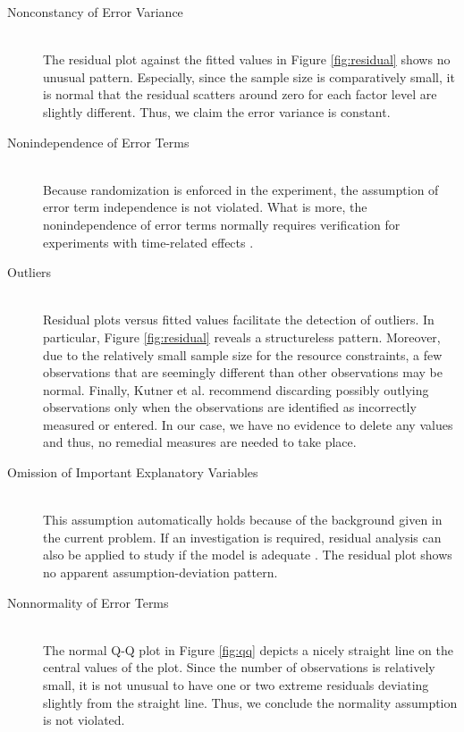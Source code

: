 \documentclass[11pt]{article}
\begin{document}
\begin{description}
\item [Nonconstancy of Error Variance] \hfill \\ The residual plot against the fitted values in Figure \ref{fig:residual} shows no unusual pattern. Especially, since the sample size is comparatively small, it is normal that the residual scatters around zero for each factor level are slightly different. Thus, we claim the error variance is constant.

\item [Nonindependence of Error Terms] \hfill \\ Because randomization is enforced in the experiment, the assumption of error term independence is not violated. What is more, the nonindependence of error terms normally requires verification for experiments with time-related effects \cite{bk:dae1, bk:dae2}.

\item [Outliers] \hfill \\ Residual plots versus fitted values facilitate the detection of outliers. In particular, Figure \ref{fig:residual} reveals a structureless pattern. Moreover, due to the relatively small sample size for the resource constraints, a few observations that are seemingly different than other observations may be normal. Finally, Kutner et al. \cite{bk:dae1} recommend discarding possibly outlying observations only when the observations are identified as incorrectly measured or entered. In our case, we have no evidence to delete any values and thus, no remedial measures are needed to take place.

\item [Omission of Important Explanatory Variables] \hfill \\ This assumption automatically holds because of the background given in the current problem. If an investigation is required, residual analysis can also be applied to study if the model is adequate \cite{bk:dae1}. The residual plot shows no apparent assumption-deviation pattern.

\item [Nonnormality of Error Terms] \hfill \\ The normal Q-Q plot in Figure \ref{fig:qq} depicts a nicely straight line on the central values of the plot. Since the number of observations is relatively small, it is not unusual to have one or two extreme residuals deviating slightly from the straight line. Thus, we conclude the normality assumption is not violated.
\end{description}
\end{document}
